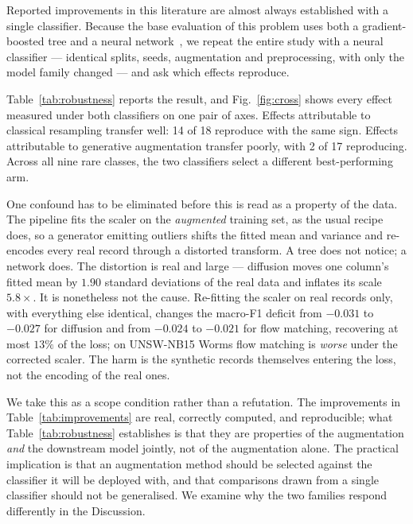 \documentclass[11pt]{article}
\begin{document}
Reported improvements in this literature are almost always established with a single
classifier. Because the base evaluation of this problem uses both a gradient-boosted
tree and a neural network~\cite{alsubaei2025smart}, we repeat the entire study with a
neural classifier --- identical splits, seeds, augmentation and preprocessing, with
only the model family changed --- and ask which effects reproduce.

Table~\ref{tab:robustness} reports the result, and Fig.~\ref{fig:cross} shows
every effect measured under both classifiers on one pair of axes. Effects attributable to classical
resampling transfer well: 14 of 18 reproduce with the same sign. Effects attributable
to generative augmentation transfer poorly, with 2 of 17 reproducing. Across all nine
rare classes, the two classifiers select a different best-performing arm.

One confound has to be eliminated before this is read as a property of the data. The
pipeline fits the scaler on the \emph{augmented} training set, as the usual recipe
does, so a generator emitting outliers shifts the fitted mean and variance and
re-encodes every real record through a distorted transform. A tree does not notice;
a network does. The distortion is real and large --- diffusion moves one column's
fitted mean by $1.90$ standard deviations of the real data and inflates its scale
$5.8\times$. It is nonetheless not the cause. Re-fitting the scaler on real records
only, with everything else identical, changes the macro-F1 deficit from $-0.031$ to
$-0.027$ for diffusion and from $-0.024$ to $-0.021$ for flow matching, recovering
at most $13\%$ of the loss; on UNSW-NB15 Worms flow matching is \emph{worse} under
the corrected scaler. The harm is the synthetic records themselves entering the
loss, not the encoding of the real ones.

We take this as a scope condition rather than a refutation. The improvements in
Table~\ref{tab:improvements} are real, correctly computed, and reproducible; what
Table~\ref{tab:robustness} establishes is that they are properties of the
augmentation \emph{and} the downstream model jointly, not of the augmentation alone.
The practical implication is that an augmentation method should be selected against
the classifier it will be deployed with, and that comparisons drawn from a single
classifier should not be generalised. We examine why the two families respond
differently in the Discussion.


\end{document}
